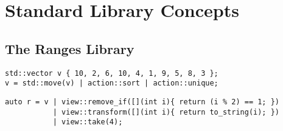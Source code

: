 \section{Standard Library Concepts} \label{sec:standard_library_concepts}

\subsection{The Ranges Library} \label{sec:the_ranges_library}

    \begin{lstlisting}
std::vector v { 10, 2, 6, 10, 4, 1, 9, 5, 8, 3 };
v = std::move(v) | action::sort | action::unique; \end{lstlisting}

    \begin{lstlisting}
auto r = v | view::remove_if([](int i){ return (i % 2) == 1; })
           | view::transform([](int i){ return to_string(i); })
           | view::take(4); \end{lstlisting}
